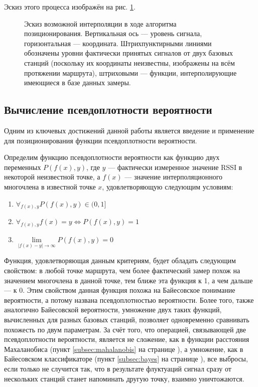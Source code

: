 Эскиз этого процесса изображён на рис. \ref{fig:madmax-interpol}.
\begin{figure}[H]
	\caption{Эскиз возможной интерполяции в ходе алгоритма позиционирования. Вертикальная ось --- уровень сигнала, горизонтальная --- координата. Штрихпунктирными линиями обозначены уровни фактически принятых сигналов от двух базовых станций (поскольку их координаты неизвестны, изображены на всём протяжении маршрута), штриховыми --- функции, интерполирующие имеющиеся в базе данных замеры.}
	\label{fig:madmax-interpol}
\end{figure}

\subsection{Вычисление псевдоплотности вероятности}

Одним из ключевых достижений данной работы является введение и применение для позиционирования функции псевдоплотности вероятности.

Определим функцию псевдоплотности вероятности как функцию двух переменных $P(f(x), y)$, где $y$ --- фактически измеренное значение RSSI в некоторой неизвестной точке, а $f(x)$ --- значение интерполяционного многочлена в известной точке $x$, удовлетворяющую следующим условиям:
\begin{enumerate}
	\item
		$\forall_{f(x), y}P(f(x), y)\in(0,1]$
	\item
		$\forall_{f(x), y}f(x) = y\Leftrightarrow{}P(f(x),y) = 1$
	\item
		$\lim\limits_{|f(x)-y|\to\infty}P(f(x),y) = 0$
\end{enumerate}

Функция, удовлетворяющая данным критериям, будет обладать следующим свойством: в любой точке маршрута, чем более фактический замер похож на значением многочлена в данной точке, тем ближе эта функция к 1, а чем дальше --- к 0. Этим свойством данная функция похожа на Байесовское понимание вероятности, а потому названа псевдоплотностью вероятности. Более того, также аналогично Байесовской вероятности, умножение двух таких функций, вычисленных для разных базовых станций, позволяет одновременно сравнивать похожесть по двум параметрам. За счёт того, что операцией, связывающей две псевдоплотности вероятности, является не сложение, как в функции расстояния Махаланобиса (пункт \ref{subsec:mahalanobis} на странице \pageref{subsec:mahalanobis}), а умножение, как в Байесовском классификаторе (пункт \ref{subsec:bayes} на странице \pageref{subsec:bayes}), все выбросы, если только не случится так, что в результате флуктуаций сигнал сразу от нескольких станций станет напоминать другую точку, взаимно уничтожаются.


